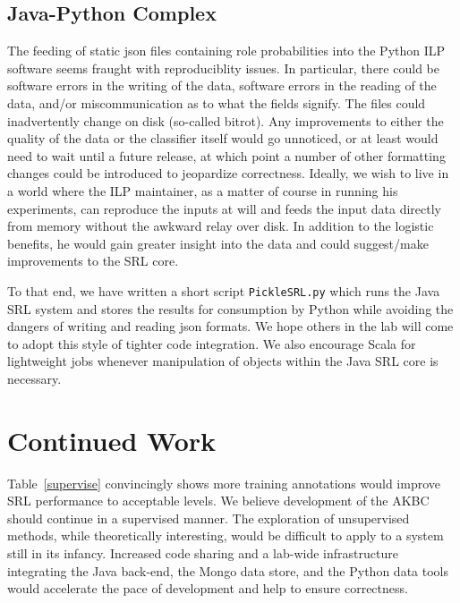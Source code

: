 \documentclass{article} %
\begin{document}
\subsection{Java-Python Complex}
The feeding of static json files containing role probabilities into the Python ILP software seems fraught with reproduciblity issues.  In particular, there could be software errors in the writing of the data, software errors in the reading of the data, and/or miscommunication as to what the fields signify.  The files could inadvertently change on disk (so-called bitrot).  Any improvements to either the quality of the data or the classifier itself would go unnoticed, or at least would need to wait until a future release, at which point a number of other formatting changes could be introduced to jeopardize correctness.  Ideally, we wish to live in a world where the ILP maintainer, as a matter of course in running his experiments, can reproduce the inputs at will and feeds the input data directly from memory without the awkward relay over disk.  In addition to the logistic benefits, he would gain greater insight into the data and could suggest/make improvements to the SRL core.

To that end, we have written a short script {\tt PickleSRL.py} which runs the Java SRL system and stores the results for consumption by Python while avoiding the dangers of writing and reading json formats.  We hope others in the lab will come to adopt this style of tighter code integration.  We also encourage Scala for lightweight jobs whenever manipulation of objects within the Java SRL core is necessary.

\section{Continued Work}
Table~\ref{supervise} convincingly shows more training annotations would improve SRL performance to acceptable levels.  We believe development of the AKBC should continue in a supervised manner.  The exploration of unsupervised methods, while theoretically interesting, would be difficult to apply to a system still in its infancy.  Increased code sharing and a lab-wide infrastructure integrating the Java back-end, the Mongo data store, and the Python data tools would accelerate the pace of development and help to ensure correctness.

\small{
\printbibliography
}
\end{document}
